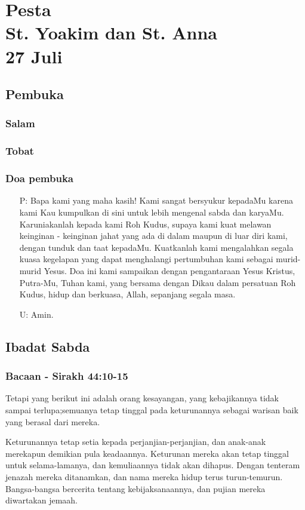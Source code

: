 \documentclass[a5paper,headsepline,titlepage,12pt,nnormalheadings,DIVcalc]{scrbook}
\newcommand{\BU}[1]{\begin{itemize} \item[U:] #1 \end{itemize}}
\newcommand{\BP}[1]{\begin{itemize} \item[P:] #1 \end{itemize}}
\begin{document}
\chapter*{Pesta \\St. Yoakim dan St. Anna \\ 27 Juli}

\section*{Pembuka}
\subsection*{Salam}
\subsection*{Tobat}
\subsection*{Doa pembuka}

\BP{Bapa kami yang maha kasih!
Kami sangat bersyukur kepadaMu
karena kami Kau kumpulkan di sini untuk lebih mengenal sabda dan karyaMu.
Karuniakanlah kepada kami Roh Kudus,
supaya kami kuat melawan keinginan - keinginan jahat
yang ada di dalam maupun di luar diri kami,
dengan tunduk dan taat kepadaMu.
Kuatkanlah kami mengalahkan segala kuasa kegelapan
yang dapat menghalangi pertumbuhan kami
sebagai murid-murid Yesus. Doa ini kami sampaikan
dengan pengantaraan Yesus Kristus, Putra-Mu, Tuhan kami, yang bersama dengan Dikau dalam persatuan Roh Kudus, hidup dan berkuasa, Allah, sepanjang segala masa. }
\BU{Amin.}

\section*{Ibadat Sabda}

\subsection*{Bacaan - Sirakh 44:10-15}

Tetapi yang berikut ini adalah orang kesayangan, yang kebajikannya tidak sampai terlupa;semuanya tetap tinggal pada keturunannya sebagai warisan baik yang berasal dari mereka.

Keturunannya tetap setia kepada perjanjian-perjanjian, dan anak-anak merekapun demikian pula keadaannya.
Keturunan mereka akan tetap tinggal untuk selama-lamanya, dan kemuliaannya tidak akan dihapus.
Dengan tenteram jenazah mereka ditanamkan, dan nama mereka hidup terus turun-temurun.
Bangsa-bangsa bercerita tentang kebijaksanaannya, dan pujian mereka diwartakan jemaah.
\end{document}

